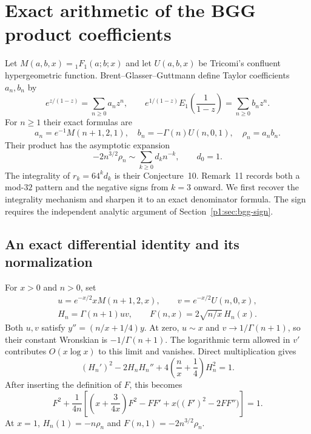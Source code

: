 \documentclass[11pt,a4paper]{article}
\theoremstyle{definition}
\theoremstyle{remark}
\numberwithin{equation}{section}
\begin{document}
\section{Exact arithmetic of the BGG product coefficients}
\label{p1:sec:bgg-arithmetic}

Let $M(a,b,x)={}_1F_1(a;b;x)$ and let $U(a,b,x)$ be Tricomi's
confluent hypergeometric function. Brent--Glasser--Guttmann
\cite{p1:BrentGlasserGuttmann2019} define Taylor coefficients $a_n,b_n$ by
\[
 e^{z/(1-z)}=\sum_{n\ge0}a_nz^n,\qquad
 e^{1/(1-z)}E_1\!\left(\frac1{1-z}\right)=\sum_{n\ge0}b_nz^n.
\]
For $n\ge1$ their exact formulas are
\[
 a_n=e^{-1}M(n+1,2,1),\quad b_n=-\Gamma(n)U(n,0,1),\quad
 \rho_n=a_nb_n.
\]
Their product has the asymptotic expansion
\[
 -2n^{3/2}\rho_n\sim\sum_{k\ge0}d_kn^{-k},\qquad d_0=1.
\]
The integrality of $r_k=64^kd_k$ is their Conjecture~10. Remark~11
records both a mod-$32$ pattern and the negative signs from $k=3$ onward.
We first recover the integrality mechanism and sharpen it to an exact
denominator formula. The sign requires the independent analytic argument
of Section~\ref{p1:sec:bgg-sign}.

\subsection{An exact differential identity and its normalization}
For $x>0$ and $n>0$, set
\[
 \begin{gathered}
 u=e^{-x/2}xM(n+1,2,x),\qquad v=e^{-x/2}U(n,0,x),\\
 H_n=\Gamma(n+1)uv,\qquad F(n,x)=2\sqrt{n/x}\,H_n(x).
 \end{gathered}
\]
Both $u,v$ satisfy $y''=(n/x+1/4)y$. At zero, $u\sim x$ and
$v\to1/\Gamma(n+1)$, so their constant Wronskian is
$-1/\Gamma(n+1)$. The logarithmic term allowed in $v'$ contributes
$O(x\log x)$ to this limit and vanishes. Direct multiplication gives
\[
 (H_n')^2-2H_nH_n''+4\left(\frac nx+\frac14\right)H_n^2=1.
\]
After inserting the definition of $F$, this becomes
\begin{equation}\label{p1:eq:bgg-exact-F}
 F^2+\frac1{4n}\left[
 \left(x+\frac3{4x}\right)F^2-FF'
 +x\bigl((F')^2-2FF''\bigr)\right]=1.
\end{equation}
At $x=1$, $H_n(1)=-n\rho_n$ and $F(n,1)=-2n^{3/2}\rho_n$.
\end{document}
